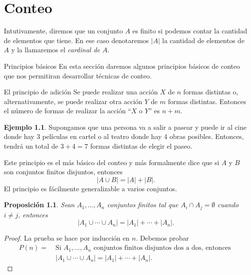 \documentclass[11pt,spanish,makeidx]{amsbook}
\newtheorem{proposicion}[teorema]{Proposici\'on}
\theoremstyle{definition}
\newtheorem{ejemplo}{Ejemplo}[section]
\theoremstyle{remark}
\begin{document}
\chapter[Conteo]{Conteo}

Intutivamente, diremos que un conjunto $A$ es finito si podemos contar la cantidad de elementos que tiene. En ese caso denotaremos $|A|$ la cantidad de elementos de $A$ y la llamaremos el {\em cardinal de $A$}.  

\begin{section}{Principios básicos}
En  esta sección daremos  algunos principios básicos de conteo que nos permitiran desarrollar técnicas de conteo. 

\begin{subsection}{El principio de adición}
Se puede realizar una acción $X$ de $n$ formas distintas o, alternativamente, se puede realizar otra acción $Y$ de $m$ formas distintas. Entonces el número de formas de realizar la acción ``$X$ o $Y$'' es $n + m$.

\begin{ejemplo}\label{cine} Supongamos que una persona va a salir a pasear  y puede ir al cine donde hay 3 películas en cartel o al teatro donde hay 4 obras posibles. Entonces, tendrá un total de $3+4=7$ formas distintas de elegir el paseo. 
\end{ejemplo}

Este principio es el más básico del conteo y más formalmente dice que si $A$ y $B$ son conjuntos finitos disjuntos, entonces 
\begin{equation}\label{padd}
|A \cup B| =|A|+|B|.
\end{equation}
El principio es fácilmente generalizable a varios conjuntos.

\begin{proposicion}\label{principiodeadicion}
	Sean $A_1,\ldots,A_n$ conjuntos finitos tal que $A_i \cap A_j = \emptyset$ cuando $i\not=j$, entonces 
	\begin{equation*}
	|A_1 \cup \cdots \cup A_n| =|A_1|+\cdots+|A_n|.
	\end{equation*}
\end{proposicion}
\begin{proof} 
	La  prueba se hace por inducción en $n$. Debemos probar 
	\begin{align*}
	P(n) =\; &\text{Si $A_1,\ldots,A_n$ conjuntos finitos disjuntos dos a dos, entonces }\\  &|A_1 \cup \cdots \cup A_n| =|A_1|+\cdots+|A_n|.
	\end{align*}
	

\end{proof}
\end{subsection}
\end{section}
\end{document}
